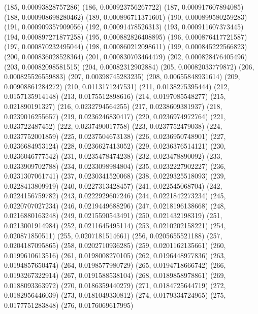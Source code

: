 {					(185, 0.00093828757286)
					(186, 0.000923756267722)
					(187, 0.000917607894085)
					(188, 0.000908698280462)
					(189, 0.000896711371601)
					(190, 0.000899580259283)
					(191, 0.000909357909056)
					(192, 0.00091478526313)
					(193, 0.000911607373445)
					(194, 0.000897271877258)
					(195, 0.000882826408895)
					(196, 0.000876417721587)
					(197, 0.000870232495044)
					(198, 0.000860212098611)
					(199, 0.000845222566823)
					(200, 0.000836028528364)
					(201, 0.000830703464479)
					(202, 0.000828476405496)
					(203, 0.00082098581515)
					(204, 0.00082312902884)
					(205, 0.00082033779872)
					(206, 0.000825526559883)
					(207, 0.00398745283235)
					(208, 0.00655848931614)
					(209, 0.00908861284272)
					(210, 0.0113171247531)
					(211, 0.0138275395444)
					(212, 0.0157135914148)
					(213, 0.0175512898616)
					(214, 0.0197085548277)
					(215, 0.021890191327)
					(216, 0.0232794564255)
					(217, 0.0238609381937)
					(218, 0.0239016255657)
					(219, 0.0236246830417)
					(220, 0.0236974972764)
					(221, 0.023722487452)
					(222, 0.0237490017758)
					(223, 0.0237752479038)
					(224, 0.0237752001859)
					(225, 0.0237504673138)
					(226, 0.0236950748901)
					(227, 0.0236684953124)
					(228, 0.0236627413052)
					(229, 0.0236376514121)
					(230, 0.0236046777542)
					(231, 0.0235478474238)
					(232, 0.023478890092)
					(233, 0.0233909702788)
					(234, 0.0233098984804)
					(235, 0.0232227902227)
					(236, 0.0231307061741)
					(237, 0.0230341520068)
					(238, 0.0229325518093)
					(239, 0.0228413809919)
					(240, 0.0227313428457)
					(241, 0.022545068704)
					(242, 0.0224156759782)
					(243, 0.0222929607246)
					(244, 0.0221842273234)
					(245, 0.0220707027234)
					(246, 0.0219449688296)
					(247, 0.0218196138668)
					(248, 0.0216880163248)
					(249, 0.0215590543491)
					(250, 0.021432198319)
					(251, 0.0213001914984)
					(252, 0.0211645495114)
					(253, 0.0210202158221)
					(254, 0.020871850511)
					(255, 0.0207181514661)
					(256, 0.0205655521188)
					(257, 0.0204187095865)
					(258, 0.0202710936285)
					(259, 0.0201162135661)
					(260, 0.0199610613516)
					(261, 0.0198008270105)
					(262, 0.0196448977836)
					(263, 0.0194857650474)
					(264, 0.0198577980729)
					(265, 0.0194718666742)
					(266, 0.0193267322914)
					(267, 0.0191588538104)
					(268, 0.0189858978861)
					(269, 0.0188093363972)
					(270, 0.0186359440279)
					(271, 0.0184725644719)
					(272, 0.0182956446039)
					(273, 0.0181049330812)
					(274, 0.0179334724965)
					(275, 0.0177751283848)
					(276, 0.0176069617995)
}
